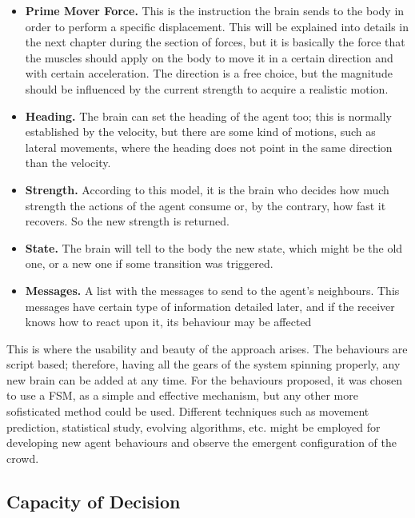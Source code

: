 \begin{itemize}

\item{{\bf Prime Mover Force.} This is the instruction the brain sends to the body in order to perform a specific displacement. This will be explained into details in the next chapter during the section of forces, but it is basically the force that the muscles should apply on the body to move it in a certain direction and with certain acceleration. The direction is a free choice, but the magnitude should be influenced by the current strength to acquire a realistic motion.}

\item{{\bf Heading.} The brain can set the heading of the agent too; this is normally established by the velocity, but there are some kind of motions, such as lateral movements, where the heading does not point in the same direction than the velocity.}

\item{{\bf Strength.} According to this model, it is the brain who decides how much strength the actions of the agent consume or, by the contrary, how fast it recovers. So the new strength is returned.}

\item{{\bf State.} The brain will tell to the body the new state, which might be the old one, or a new one if some transition was triggered.}

\item{{\bf Messages.} A list with the messages to send to the agent's neighbours. This messages have certain type of information detailed later, and if the receiver knows how to react upon it, its behaviour may be affected}

\end{itemize}

This is where the usability and beauty of the approach arises. The behaviours are script based; therefore, having all the gears of the system spinning properly, any new brain can be added at any time. For the behaviours proposed, it was chosen to use a FSM, as a simple and effective mechanism, but any other more sofisticated method could be used. Different techniques such as movement prediction, statistical study, evolving algorithms, etc. might be employed for developing new agent behaviours and observe the emergent configuration of the crowd.

\subsection{Capacity of Decision}

